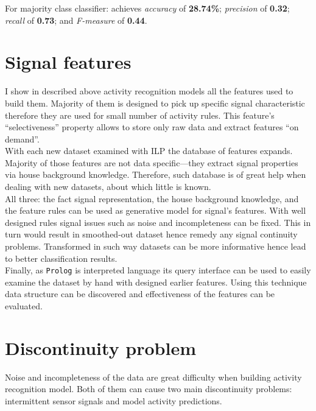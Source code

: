 \documentclass[10pt, a4paper, pdflatex, leqno, twoside, openright]{report}
\begin{document}
For majority class classifier: achieves \emph{accuracy} of \textbf{28.74\%}; \emph{precision} of \textbf{0.32}; \emph{recall} of \textbf{0.73}; and \emph{F-measure} of \textbf{0.44}.

  \section{Signal features\label{sec:single:features}\label{sec:multiple:features}}
I show in described above activity recognition models all the features used to build them. Majority of them is designed to pick up specific signal characteristic therefore they are used for small number of activity rules. This feature's ``selectiveness'' property allows to store only raw data and extract features ``on demand''.\\
With each new dataset examined with ILP the database of features expands. Majority of those features are not data specific---they extract signal properties via house background knowledge. Therefore, such database is of great help when dealing with new datasets, about which little is known.\\

All three: the fact signal representation, the house background knowledge, and the feature rules can be used as generative model for signal's features. With well designed rules signal issues such as noise and incompleteness can be fixed. This in turn would result in smoothed-out dataset hence remedy any signal continuity problems. Transformed in such way datasets can be more informative hence lead to better classification results.\\
Finally, as \texttt{Prolog} is interpreted language its query interface can be used to easily examine the dataset by hand with designed earlier features. Using this technique data structure can be discovered and effectiveness of the features can be evaluated.

  \section{Discontinuity problem\label{sec:predictionDiscontinuity}}
Noise and incompleteness of the data are great difficulty when building activity recognition model. Both of them can cause two main discontinuity problems: intermittent sensor signals and model activity predictions.
\end{document}
